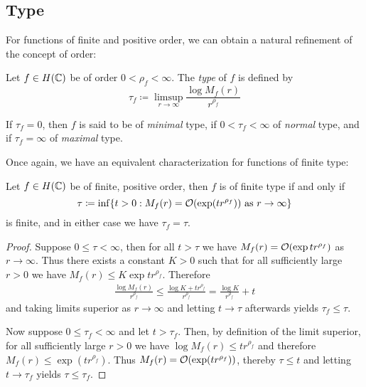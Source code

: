 \subsection{Type}

For functions of finite and positive order, we can obtain a natural refinement of the concept of order:

\begin{definition}
    Let $f \in H(\mathbb{C})$ be of order $0 < \rho_f < \infty$. The \emph{type} of $f$ is defined by
    \begin{equation} \label{eq:def-type}
        \tau_f \coloneqq \limsup_{r \to \infty} \frac{\log M_f(r)}{r^{\rho_f}}
    \end{equation}

    If $\tau_f = 0$, then $f$ is said to be of \emph{minimal} type, if $0 < \tau_f < \infty$ of \emph{normal} type, and if $\tau_f = \infty$ of \emph{maximal} type.
\end{definition}

Once again, we have an equivalent characterization for functions of finite type:

\begin{proposition} \label{prop:type-infimum}
    Let $f \in H(\mathbb{C})$ be of finite, positive order, then $f$ is of finite type if and only if
    \begin{equation}
        \tau \coloneqq \inf \{ t > 0 : M_f(r) = \mathcal{O}(\exp (t r^{\rho_f})) \textrm{ as } r \to \infty \}
    \end{equation}
    is finite, and in either case we have $\tau_f = \tau$.
\end{proposition}

\begin{proof}
    Suppose $0 \leq \tau < \infty$, then for all $t > \tau$ we have $M_f(r) = \mathcal{O}(\exp t r^{\rho_f})$ as $r \to \infty$. Thus there exists a constant $K > 0$ such that for all sufficiently large $r > 0$ we have $M_f(r) \leq K \exp t r^{\rho_f}$. Therefore
    \begin{align*}
        \frac{\log M_f(r)}{r^{\rho_f}} \leq \frac{\log K + t r^{\rho_f}}{r^{\rho_f}} = \frac{\log K}{r^{\rho_f}} + t
    \end{align*}
    and taking limits superior as $r \to \infty$ and letting $t \to \tau$ afterwards yields $\tau_f \leq \tau$.

    Now suppose $0 \leq \tau_f < \infty$ and let $t > \tau_f$. Then, by definition of the limit superior, for all sufficiently large $r > 0$ we have $ \log M_f(r) \leq t r^{\rho_f}$ and therefore $M_f(r) \leq \exp(t r^{\rho_f})$. Thus $M_f(r) = \mathcal{O}(\exp (t r^{\rho_f}))$, thereby $\tau \leq t$ and letting $t \to \tau_f$ yields $\tau \leq \tau_f$.
\end{proof}

